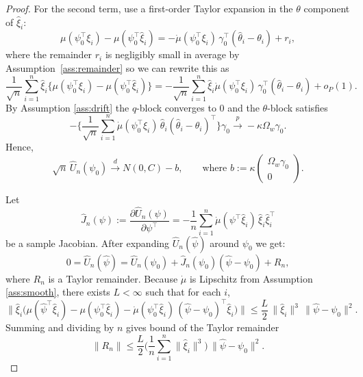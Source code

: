 \documentclass[11pt]{article}
\theoremstyle{definition}
\theoremstyle{remark}
\newcommand{\toP}{\xrightarrow{\,p\,}}
\newcommand{\tod}{\xrightarrow{\,d\,}}
\begin{document}
\begin{proof}
For the second term, use a first-order Taylor expansion in the $\theta$ component of $\hat\xi_i$:
\[
\mu(\psi_0^\top\xi_i)-\mu(\psi_0^\top\hat\xi_i)
=-\dot\mu(\psi_0^\top\xi_i)\,\gamma_0^\top(\hat\theta_i-\theta_i)+r_i,
\]
where the remainder $r_i$ is negligibly small in average by Assumption~\ref{ass:remainder} so we can rewrite this as
\begin{equation}
\frac{1}{\sqrt{n}}\sum_{i=1}^n \hat\xi_i\Big\{\mu(\psi_0^\top\xi_i)-\mu(\psi_0^\top\hat\xi_i)\Big\}
=
-\frac{1}{\sqrt{n}}\sum_{i=1}^n \hat\xi_i\dot\mu(\psi_0^\top\xi_i)\,\gamma_0^\top(\hat\theta_i-\theta_i)+o_P(1).
\label{eq:drift-new}
\end{equation}
By Assumption \ref{ass:drift} the $q$-block converges to $0$ and the $\theta$-block satisfies
\[
-\Bigg\{\frac{1}{\sqrt{n}}\sum_{i=1}^n \dot\mu(\psi_0^\top\xi_i)\,\hat\theta_i(\hat\theta_i-\theta_i)^\top\Bigg\}\gamma_0
\toP -\kappa\Omega_w\gamma_0.
\]
Hence,
\begin{equation}
\sqrt{n}\,\hat U_n(\psi_0)\tod N(0,C)-b,
\qquad \text{where } b:=\kappa\begin{pmatrix}\Omega_w\gamma_0\\0\end{pmatrix}.
\label{eq:Un-limit-new}
\end{equation}

Let
\[
\hat J_n(\psi):=\frac{\partial\hat U_n(\psi)}{\partial\psi^\top}
=-\frac{1}{n}\sum_{i=1}^n \dot\mu(\psi^\top\hat\xi_i)\,\hat\xi_i\hat\xi_i^\top
\]
be a sample Jacobian. After expanding $\hat U_n(\hat\psi)$ around $\psi_0$ we get:
\begin{equation}
0=\hat U_n(\hat\psi)=\hat U_n(\psi_0)+\hat J_n(\psi_0)(\hat\psi-\psi_0)+R_n,
\label{eq:taylor-psi0}
\end{equation}
where $R_n$ is a Taylor remainder. Because $\dot\mu$ is Lipschitz from Assumption \ref{ass:smooth}, there exists $L<\infty$ such that for each $i$,
\[
\Big\|\hat\xi_i\big(\mu(\hat\psi^\top\hat\xi_i)-\mu(\psi_0^\top\hat\xi_i)-\dot\mu(\psi_0^\top\hat\xi_i)\,(\hat\psi-\psi_0)^\top\hat\xi_i\big)\Big\|
\le \frac{L}{2}\,\|\hat\xi_i\|^3\,\|\hat\psi-\psi_0\|^2.
\]
Summing and dividing by $n$ gives bound of the Taylor remainder
\begin{equation}
\|R_n\|\le \frac{L}{2}\Big(\frac{1}{n}\sum_{i=1}^n \|\hat\xi_i\|^3\Big)\,\|\hat\psi-\psi_0\|^2.
\label{eq:Rn-bound}
\end{equation}


\end{proof}
\end{document}
